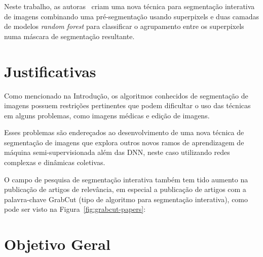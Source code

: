 Neste trabalho, as autoras~ criam uma nova
técnica para segmentação interativa de imagens combinando uma
pré-segmentação usando superpixels e duas camadas de modelos
\textit{random forest} para classificar o agrupamento entre os
superpixels numa máscara de segmentação resultante.


\section{Justificativas}\label{sec:justificativas}

Como mencionado na Introdução, os algoritmos conhecidos de segmentação
de imagens possuem restrições pertinentes que podem dificultar o uso
das técnicas em alguns problemas, como imagens médicas e edição de
imagens.

Esses problemas são endereçados ao desenvolvimento de uma nova técnica
de segmentação de imagens que explora outros novos ramos de
aprendizagem de máquina semi-supervisionada além das \gls{DNN}, neste
caso utilizando redes complexas e dinâmicas coletivas.

O campo de pesquisa de segmentação interativa também tem tido aumento
na publicação de artigos de relevância, em especial a publicação de
artigos com a palavra-chave GrabCut (tipo de algoritmo para
segmentação interativa), como pode ser visto na
Figura~\ref{fig:grabcut-papers}:

\begin{figure}[!h]
        \captionsetup{width=12cm}
		\centering
\end{figure}



\section{Objetivo Geral}\label{sec:objetivo-geral}

